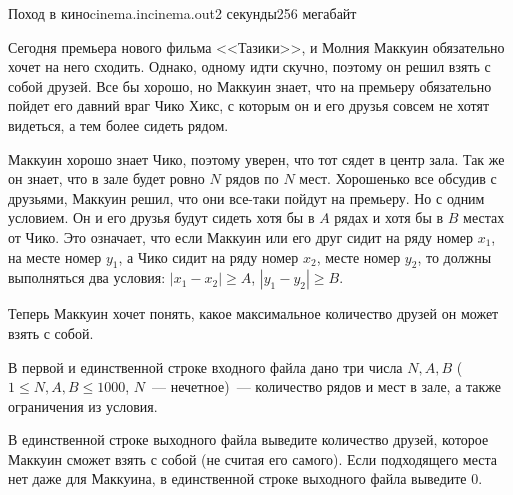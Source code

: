 \begin{problem}{Поход в кино}{cinema.in}{cinema.out}{2 секунды}{256 мегабайт}
                                                                    

Сегодня премьера нового фильма <<Тазики>>, и Молния Маккуин обязательно хочет на него сходить. Однако, одному идти скучно, поэтому он
решил взять с собой друзей. Все бы хорошо, но Маккуин знает, что на премьеру обязательно пойдет его давний враг Чико Хикс, с которым он
и его друзья совсем не хотят видеться, а тем более сидеть рядом.

Маккуин хорошо знает Чико, поэтому уверен, что тот сядет в центр зала. Так же он знает, что в зале будет ровно $N$ рядов по $N$ мест.
Хорошенько все обсудив с друзьями, Маккуин решил, что они все-таки пойдут на премьеру. Но с одним условием. Он и его друзья будут сидеть
хотя бы в $A$ рядах и хотя бы в $B$ местах от Чико. Это означает, что если Маккуин или его друг сидит на ряду номер $x_1$, на месте номер $y_1$,
а Чико сидит на ряду номер $x_2$, месте номер $y_2$, то должны выполняться два условия: $|x_1-x_2| \ge A$, $|y_1-y_2| \ge B$.

Теперь Маккуин хочет понять, какое максимальное количество друзей он может взять с собой.

\InputFile
В первой и единственной строке входного файла дано три числа $N, A, B$ ($1 \le N, A, B \le 1000$, $N$~--- нечетное)~--- количество рядов
и мест в зале, а также ограничения из условия.

\OutputFile
В единственной строке выходного файла выведите количество друзей, которое Маккуин сможет взять с собой (не считая его самого).
Если подходящего места нет даже для Маккуина, в единственной строке выходного файла выведите 0.

\Example
\begin{example}%
%
%
\end{example}

\end{problem}